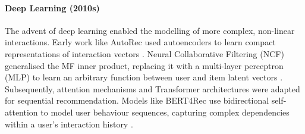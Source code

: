 \paragraph{Deep Learning (2010s)} The advent of deep learning enabled the modelling of more complex, non-linear interactions. Early work like AutoRec used autoencoders to learn compact representations of interaction vectors \cite{sedhain2015autorec}. Neural Collaborative Filtering (NCF) generalised the MF inner product, replacing it with a multi-layer perceptron (MLP) to learn an arbitrary function between user and item latent vectors \cite{he2017neural}. Subsequently, attention mechanisms and Transformer architectures were adapted for sequential recommendation. Models like BERT4Rec use bidirectional self-attention to model user behaviour sequences, capturing complex dependencies within a user's interaction history \cite{sun2019bert4rec}.

